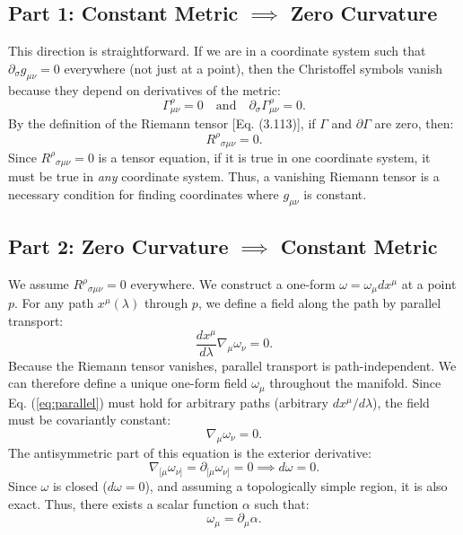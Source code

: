\documentclass[11pt, a4paper]{report}
\begin{document}
\subsection*{Part 1: Constant Metric $\implies$ Zero Curvature}
This direction is straightforward. If we are in a coordinate system such that $\partial_\sigma g_{\mu\nu} = 0$ everywhere (not just at a point), then the Christoffel symbols vanish because they depend on derivatives of the metric:
\begin{equation}
    \Gamma^\rho_{\mu\nu} = 0 \quad \text{and} \quad \partial_\sigma \Gamma^\rho_{\mu\nu} = 0.
\end{equation}
By the definition of the Riemann tensor [Eq. (3.113)], if $\Gamma$ and $\partial \Gamma$ are zero, then:
\begin{equation}
    R^\rho{}_{\sigma\mu\nu} = 0.
\end{equation}
Since $R^\rho{}_{\sigma\mu\nu} = 0$ is a tensor equation, if it is true in one coordinate system, it must be true in \textit{any} coordinate system. Thus, a vanishing Riemann tensor is a necessary condition for finding coordinates where $g_{\mu\nu}$ is constant.

\subsection*{Part 2: Zero Curvature $\implies$ Constant Metric}
We assume $R^\rho{}_{\sigma\mu\nu} = 0$ everywhere. We construct a one-form $\omega = \omega_\mu dx^\mu$ at a point $p$. For any path $x^\mu(\lambda)$ through $p$, we define a field along the path by parallel transport:
\begin{equation}
    \frac{dx^\mu}{d\lambda} \nabla_\mu \omega_\nu = 0. \label{eq:parallel}
\end{equation}
Because the Riemann tensor vanishes, parallel transport is path-independent. We can therefore define a unique one-form field $\omega_\mu$ throughout the manifold. Since Eq. (\ref{eq:parallel}) must hold for arbitrary paths (arbitrary $dx^\mu/d\lambda$), the field must be covariantly constant:
\begin{equation}
    \nabla_\mu \omega_\nu = 0. \label{eq:cov_const}
\end{equation}
The antisymmetric part of this equation is the exterior derivative:
\begin{equation}
    \nabla_{[\mu} \omega_{\nu]} = \partial_{[\mu} \omega_{\nu]} = 0 \implies d\omega = 0.
\end{equation}
Since $\omega$ is closed ($d\omega=0$), and assuming a topologically simple region, it is also exact. Thus, there exists a scalar function $\alpha$ such that:
\begin{equation}
    \omega_\mu = \partial_\mu \alpha.
\end{equation}
\end{document}

